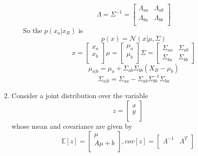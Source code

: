 \documentclass[a4paper]{article}
\begin{document}
\begin{enumerate}
\begin{enumerate}
\begin{solution}
				\begin{equation*}
					\Lambda=\Sigma^{-1}=\begin{bmatrix}
					\Lambda_{aa}&\Lambda_{ab}\\
					\Lambda_{ba}&\Lambda_{bb}\\
					\end{bmatrix}
				\end{equation*}
				So the $p(x_a|x_B)$ is 
				\begin{equation*}
					p(x)=\mathcal{N}(x|\mu,\Sigma)
				\end{equation*}
				\begin{equation*}
					x=\begin{bmatrix}
					x_a\\
					x_b\\
					\end{bmatrix}
					\mu=\begin{bmatrix}
					\mu_a\\
					\mu_b \\
					\end{bmatrix}
					\Sigma=\begin{bmatrix}
					\Sigma_{aa}&\Sigma_{ab}\\
					\Sigma_{ba}&\Sigma_{bb}
					\end{bmatrix}
				\end{equation*}
				\begin{equation*}
					\mu_{a|b}=\mu_a+\Sigma_{ab}\Sigma_{bb}(X_B-\mu_b)
				\end{equation*}
				\begin{equation*}
					\Sigma_{a|b}=\Sigma_{aa}-\Sigma_{ab}\Sigma_{bb}^{-1}\Sigma_{ba}
				\end{equation*}
			\end{solution}
		\end{enumerate}
		\item
		Consider a joint distribution over the variable
		$$
		z=\begin{bmatrix}
		x\\
		y\\
		\end{bmatrix}
		$$
		whose mean and covariance are given by
		$$
		\mathbb{E}[z]=\begin{bmatrix}
		\mu\\
		A\mu+b\\
		\end{bmatrix}
		,
		cov[z]=\begin{bmatrix}
		\Lambda^{-1} & \Lambda^{T} \\

\end{bmatrix}$$
\end{enumerate}
\end{document}
